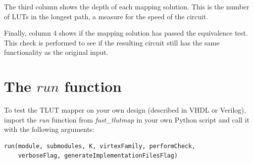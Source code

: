 \documentclass[a4paper,oneside]{memoir}
\begin{document}
\begin{enumerate}
The third column shows the depth of each mapping solution. This is the number of LUTs in the longest path, a measure for the speed of the circuit. 

Finally, column 4 shows if the mapping solution has passed the equivalence test. This check is performed to see if the resulting circuit still has the same functionality as the original input.


\end{enumerate}


\section{The $run$ function}\label{sec:run_function}
To test the TLUT mapper on your own design (described in VHDL or Verilog), import the \emph{run} function from \emph{fast\_tlutmap} in your own Python script and call it with the following arguments:
\begin{lstlisting}
run(module, submodules, K, virtexFamily, performCheck, 
	verboseFlag, generateImplementationFilesFlag)
\end{lstlisting}
\end{document}
